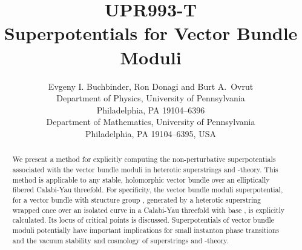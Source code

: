 \documentclass[a4paper,12pt]{article}
\numberwithin{equation}{section}
\providecommand{\ns}{\normalsize}
\theoremstyle{plain}
\begin{document}

\begin{titlepage}

\vspace{-5cm}

\title{
   \hfill{\ns UPR993-T} \\[1em]
   {\LARGE Superpotentials for Vector Bundle Moduli}
\\
[1em] }
\author{
   Evgeny I. Buchbinder\coordHE{}, Ron Donagi\coordHE{} and
Burt A.~Ovrut\coordHE{} \\[0.5em]
   {\ns {}\coordHE{}Department of Physics, University of Pennsylvania} \\[-0.4em]
   {\ns Philadelphia, PA 19104--6396}\\
   {\ns {}\coordHE{}Department of Mathematics, University of Pennsylvania}
   \\[-0.4em]
   {\ns Philadelphia, PA 19104--6395, USA}\\}

\date{}

\maketitle

\begin{abstract}

We present a method for explicitly computing the non-perturbative
superpotentials associated with the vector bundle moduli in heterotic
superstrings
and \coordHE{}-theory. This method is applicable to any stable,
holomorphic vector bundle over an elliptically fibered Calabi-Yau
threefold.
For specificity, the vector bundle moduli superpotential, for a vector
bundle with
structure group \coordHE{}, generated by a heterotic
superstring wrapped once over an isolated curve in a Calabi-Yau threefold
with
base \coordHE{}, is explicitly calculated. Its locus of critical
points is discussed. Superpotentials of vector bundle moduli potentially
have
important implications for small instanton phase transitions and the
vacuum
stability and cosmology of superstrings and \coordHE{}-theory.


\end{abstract}

\thispagestyle{empty}

\end{titlepage}
\end{document}
